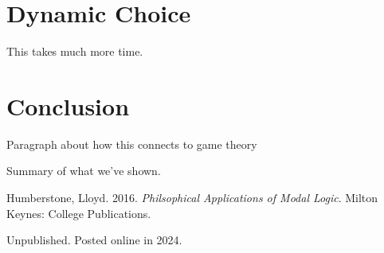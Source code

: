 \documentclass[
  10pt,
  letterpaper,
  DIV=11,
  numbers=noendperiod,
  twoside]{scrartcl}
\newlength{\cslhangindent}
\newenvironment{CSLReferences}[2] %
 {\begin{list}{}{%
  \setlength{\itemindent}{0pt}
  \setlength{\leftmargin}{0pt}
  \setlength{\parsep}{0pt}
  \ifodd #1
   \setlength{\leftmargin}{\cslhangindent}
   \setlength{\itemindent}{-1\cslhangindent}
  \fi
  \setlength{\itemsep}{#2\baselineskip}}}
 {\end{list}}
\begin{document}
\section{Dynamic Choice}\label{dynamic-choice-1}

This takes much more time.

\section{Conclusion}\label{conclusion}

Paragraph about how this connects to game theory

Summary of what we've shown.

\label{refs}
\begin{CSLReferences}{1}{0}
Humberstone, Lloyd. 2016. \emph{Philsophical Applications of Modal
Logic}. Milton Keynes: College Publications.

\end{CSLReferences}



\noindent Unpublished. Posted online in 2024.
\end{document}
